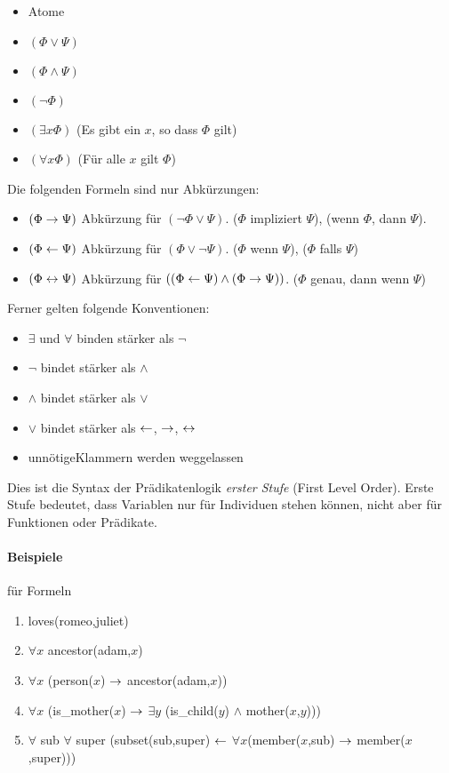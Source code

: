 \documentclass[a4paper,twoside,DIV15,BCOR12mm]{scrbook}
\begin{document}
\begin{itemize}
\item Atome
\item $(\Phi \vee \Psi)$
\item $(\Phi \wedge \Psi)$
\item $(\neg \Phi)$
\item $(\exists x \Phi)$ (\glqq Es gibt ein $x$, so dass $\Phi$ gilt\grqq)
\item $(\forall x \Phi)$ (\glqq Für alle $x$ gilt $\Phi$\grqq)
\end{itemize}

Die folgenden Formeln sind nur Abkürzungen:
\begin{itemize}
\item $(\Phi \rightarrow \Psi)$ Abkürzung für $(\neg \Phi \vee \Psi)$.
 (\glqq $\Phi$ impliziert $\Psi$\grqq), (\glqq wenn $\Phi$, dann $\Psi$\grqq).
\item $(\Phi \leftarrow \Psi)$ Abkürzung für $(\Phi \vee \neg \Psi)$. (\glqq $\Phi$ wenn $\Psi$\grqq), (\glqq $\Phi$ falls $\Psi$\grqq) 
\item $(\Phi \leftrightarrow \Psi)$ Abkürzung für $((\Phi \leftarrow \Psi)\wedge(\Phi\rightarrow\Psi))$. (\glqq $\Phi$ genau, dann wenn $\Psi$\grqq)
\end{itemize}

Ferner gelten folgende Konventionen:
\begin{itemize}
\item $\exists$ und $\forall$ binden stärker als $\neg$
\item $\neg$ bindet stärker als $\wedge$
\item $\wedge$ bindet stärker als $\vee$
\item $\vee$ bindet stärker als $\leftarrow$, $\rightarrow$, $\leftrightarrow$
\item \glqq unnötige\grqq Klammern werden weggelassen
\end{itemize}

Dies ist die Syntax der Prädikatenlogik \emph{erster Stufe} (First Level Order). Erste Stufe bedeutet, dass Variablen nur für Individuen stehen können, nicht aber für Funktionen oder Prädikate.

\paragraph{Beispiele} für Formeln
\begin{enumerate}
\item  loves(romeo,juliet)
\item $\forall x$ ancestor(adam,$x$)
\item $\forall x$ (person($x$) $\rightarrow$ ancestor(adam,$x$))
\item $\forall x$ (is\_mother($x$) $\rightarrow$ $\exists y$ (is\_child($y$) $\wedge$ mother($x$,$y$)))
\item $\forall$ sub $\forall$ super (subset(sub,super) $\leftarrow$ $\forall x$(member($x$,sub) $\rightarrow$ member($x$,super)))
\end{enumerate}
\end{document}
